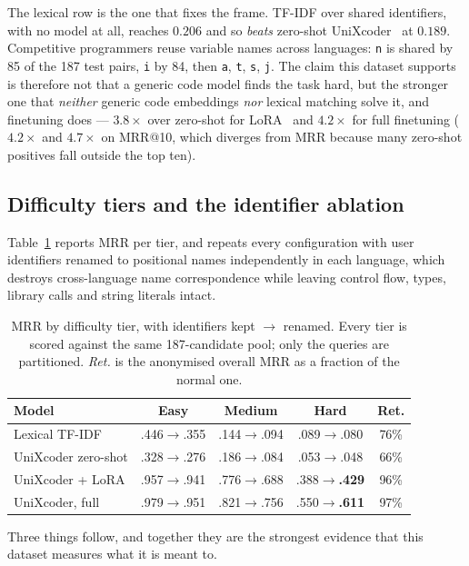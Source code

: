 The lexical row is the one that fixes the frame. TF-IDF over shared
identifiers, with no model at all, reaches $0.206$ and so \emph{beats}
zero-shot UniXcoder~\cite{guo2022unixcoder} at $0.189$. Competitive programmers reuse variable names
across languages: \texttt{n} is shared by 85 of the 187 test pairs,
\texttt{i} by 84, then \texttt{a}, \texttt{t}, \texttt{s}, \texttt{j}. The
claim this dataset supports is therefore not that a generic code model finds
the task hard, but the stronger one that \emph{neither} generic code
embeddings \emph{nor} lexical matching solve it, and finetuning does ---
$3.8\times$ over zero-shot for LoRA~\cite{hu2022lora} and $4.2\times$ for
full finetuning
($4.2\times$ and $4.7\times$ on MRR@10, which diverges from MRR because many
zero-shot positives fall outside the top ten).

\subsection{Difficulty tiers and the identifier ablation}

Table~\ref{tab:bytier} reports MRR per tier, and repeats every configuration
with user identifiers renamed to positional names independently in each
language, which destroys cross-language name correspondence while leaving
control flow, types, library calls and string literals intact.

\begin{table}[tbp]
\caption{MRR by difficulty tier, with identifiers kept $\to$ renamed. Every tier is
scored against the same 187-candidate pool; only the queries are partitioned.
\emph{Ret.} is the anonymised overall MRR as a fraction of the normal one.}
\label{tab:bytier}
\centering
\begin{tabular}{@{}l@{~}cccc@{}}
\toprule
Model & Easy & Medium & Hard & Ret. \\
\midrule
Lexical TF-IDF       & .446$\to$.355 & .144$\to$.094 & .089$\to$.080 & 76\% \\
UniXcoder zero-shot  & .328$\to$.276 & .186$\to$.084 & .053$\to$.048 & 66\% \\
UniXcoder + LoRA     & .957$\to$.941 & .776$\to$.688 & .388$\to$\textbf{.429} & 96\% \\
UniXcoder, full      & .979$\to$.951 & .821$\to$.756 & .550$\to$\textbf{.611} & 97\% \\
\bottomrule
\end{tabular}
\end{table}

Three things follow, and together they are the strongest evidence that this
dataset measures what it is meant to.

